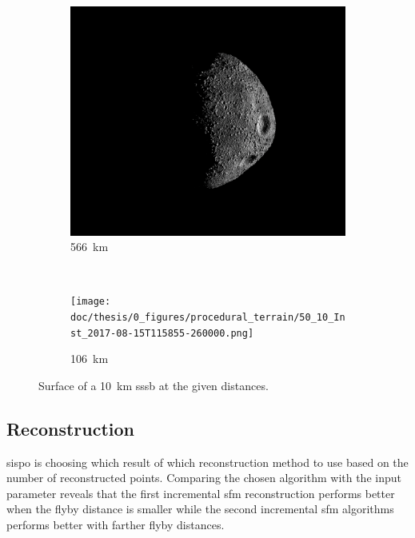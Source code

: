 \begin{figure}[htb]
    \begin{center}
        \begin{subfigure}[b]{0.75\textwidth}
            \begin{center}
                \includegraphics[width=\textwidth]{doc/thesis/0_figures/procedural_terrain/50_10_Inst_2017-08-15T115755-845000.png}
            \end{center}
            \caption{\SI{566}{\kilo\meter}}
            \label{fig:img_procedural_500}
        \end{subfigure}
        \\
        \begin{subfigure}[b]{0.75\textwidth}
            \begin{center}
                \texttt{[image: doc/thesis/0\_figures/procedural\_terrain/50\_10\_Inst\_2017-08-15T115855-260000.png]}
            \end{center}
            \caption{\SI{106}{\kilo\meter}}
            \label{fig:img_procedural_100}
        \end{subfigure}
    \end{center}
    \caption{Surface of a \SI{10}{\kilo\meter} \gls{sssb} at the given distances.}
    \label{fig:img_procedural_10k}
\end{figure}


\subsection{Reconstruction}
\gls{sispo} is choosing which result of which reconstruction method to use based on the number of reconstructed points. Comparing the chosen algorithm with the input parameter reveals that the first incremental \gls{sfm} reconstruction performs better when the flyby distance is smaller while the second incremental \gls{sfm} algorithms performs better with farther flyby distances.

